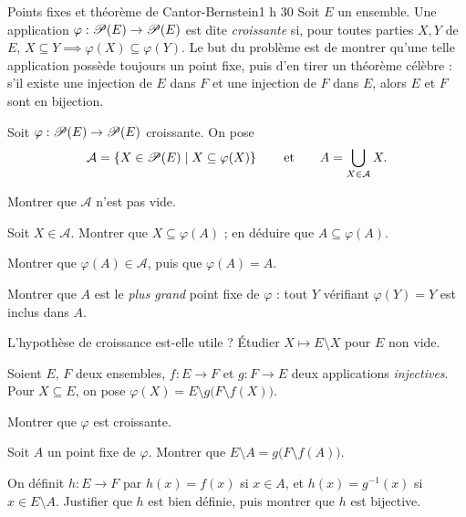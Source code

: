 

\begin{defi}{Points fixes et théorème de Cantor-Bernstein}{1 h 30}
Soit $E$ un ensemble. Une application $\varphi:\mathscr{P}(E)\to\mathscr{P}(E)$
est dite \emph{croissante} si, pour toutes parties $X,Y$ de $E$,
$X\subseteq Y\implies\varphi(X)\subseteq\varphi(Y)$. Le but du problème est
de montrer qu'une telle application possède toujours un point fixe, puis
d'en tirer un théorème célèbre : s'il existe une injection de $E$ dans $F$
et une injection de $F$ dans $E$, alors $E$ et $F$ sont en bijection.

Soit $\varphi:\mathscr{P}(E)\to\mathscr{P}(E)$ croissante. On pose
\[
\mathcal{A}=\left\{X\in\mathscr{P}(E)\mid X\subseteq\varphi(X)\right\}
\qquad\text{et}\qquad
A=\bigcup_{X\in\mathcal{A}}X .
\]
\begin{questions}
  \item Montrer que $\mathcal{A}$ n'est pas vide.
  \item Soit $X\in\mathcal{A}$. Montrer que $X\subseteq\varphi(A)$ ; en
    déduire que $A\subseteq\varphi(A)$.
  \item Montrer que $\varphi(A)\in\mathcal{A}$, puis que $\varphi(A)=A$.
  \item Montrer que $A$ est le \emph{plus grand} point fixe de $\varphi$ :
    tout $Y$ vérifiant $\varphi(Y)=Y$ est inclus dans $A$.
  \item L'hypothèse de croissance est-elle utile ? Étudier
    $X\mapsto E\setminus X$ pour $E$ non vide.
\end{questions}

Soient $E$, $F$ deux ensembles, $f:E\to F$ et $g:F\to E$ deux applications
\emph{injectives}. Pour $X\subseteq E$, on pose
$\varphi(X)=E\setminus g\bigl(F\setminus f(X)\bigr)$.
\begin{questions}[resume]
  \item Montrer que $\varphi$ est croissante.
  \item Soit $A$ un point fixe de $\varphi$. Montrer que
    $E\setminus A=g\bigl(F\setminus f(A)\bigr)$.
  \item On définit $h:E\to F$ par $h(x)=f(x)$ si $x\in A$, et
    $h(x)=g^{-1}(x)$ si $x\in E\setminus A$. Justifier que $h$ est bien
    définie, puis montrer que $h$ est bijective.
\end{questions}


\end{defi}
